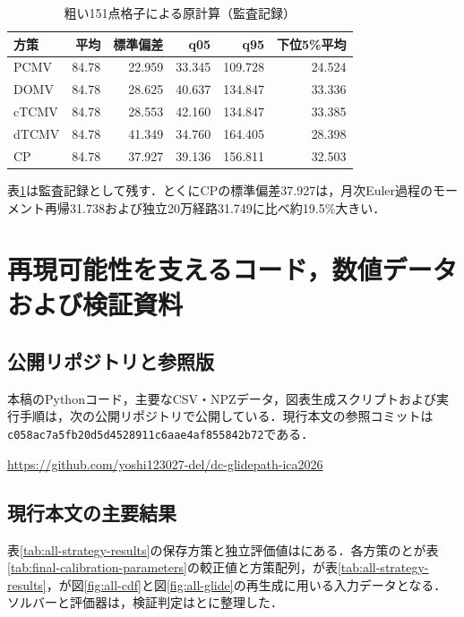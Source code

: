 \documentclass[10pt,a4paper]{article}
\theoremstyle{plain}
\theoremstyle{definition}
\begin{document}
\begin{table}[H]\centering\scriptsize
\caption{粗い151点格子による原計算（監査記録）}\label{tab:legacy-results-audit}
\begin{tabular}{lrrrrr}\toprule
方策 & 平均 & 標準偏差 & q05 & q95 & 下位5\%平均\\\midrule
PCMV &84.78&22.959&33.345&109.728&24.524\\
DOMV &84.78&28.625&40.637&134.847&33.336\\
cTCMV&84.78&28.553&42.160&134.847&33.385\\
dTCMV&84.78&41.349&34.760&164.405&28.398\\
CP&84.78&37.927&39.136&156.811&32.503\\\bottomrule
\end{tabular}\end{table}
表\ref{tab:legacy-results-audit}は監査記録として残す．とくにCPの標準偏差37.927は，月次Euler過程のモーメント再帰31.738および独立20万経路31.749に比べ約19.5\%大きい．

\clearpage
\section{再現可能性を支えるコード，数値データおよび検証資料}
\label{app:reproducibility}

\subsection{公開リポジトリと参照版}

本稿のPythonコード，主要なCSV・NPZデータ，図表生成スクリプトおよび実行手順は，次の公開リポジトリで公開している．現行本文の参照コミットは\texttt{c058ac7a5fb20d5d4528911c6aae4af855842b72}である．
\begin{center}
\url{https://github.com/yoshi123027-del/dc-glidepath-ica2026}
\end{center}

\subsection{現行本文の主要結果}
表\ref{tab:all-strategy-results}の保存方策と独立評価値はにある．各方策のとが表\ref{tab:final-calibration-parameters}の較正値と方策配列，が表\ref{tab:all-strategy-results}，が図\ref{fig:all-cdf}と図\ref{fig:all-glide}の再生成に用いる入力データとなる．ソルバーと評価器は，検証判定はとに整理した．
\end{document}
